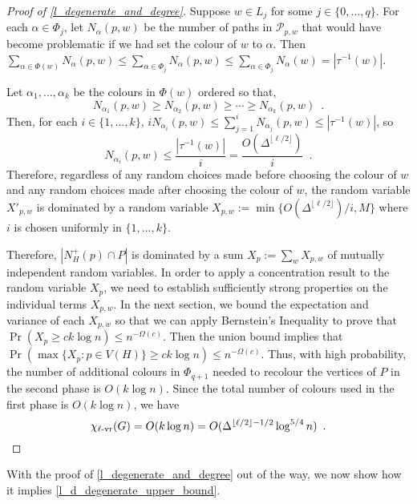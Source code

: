 \documentclass{patmorin}
\newcommand{\rn}[1]{\chi_{\operatorname{#1-vr}}}
\newcommand{\lrn}{\rn{\ell}}
\begin{document}
\begin{proof}[Proof of \cref{l_degenerate_and_degree}]
  Suppose $w\in L_j$ for some $j\in\{0,\ldots,q\}$.  For each $\alpha\in\Phi_j$, let $N_\alpha(p,w)$ be the number of paths in $\mathcal{P}_{p,w}$ that would have become problematic if we had set the colour of $w$ to $\alpha$. Then $\sum_{\alpha\in\Phi(w)} N_\alpha(p,w) \le \sum_{\alpha\in\Phi_j} N_\alpha(p,w) \le \sum_{\alpha\in\Phi_j} N_\alpha(w) = |\tau^{-1}(w)|$.

  Let $\alpha_1,\ldots,\alpha_k$ be the colours in $\Phi(w)$ ordered so that,
  \[
    N_{\alpha_1}(p,w) \ge N_{\alpha_2}(p,w) \ge\cdots\ge N_{\alpha_k}(p,w) \enspace .
  \]
  Then, for each $i\in\{1,\ldots,k\}$, $iN_{\alpha_i}(p,w)\le\sum_{j=1}^i N_{\alpha_j}(p,w) \le |\tau^{-1}(w)|$, so
  \[
    N_{\alpha_i}(p,w)\le \frac{|\tau^{-1}(w)|}{i}=\frac{O(\Delta^{\lfloor\ell/2\rfloor})}{i} \enspace .
  \]
  Therefore, regardless of any random choices made before choosing the colour of $w$ and any random choices made after choosing the colour of $w$, the random variable $X'_{p,w}$ is dominated by a random variable $X_{p,w}:=\min\{O(\Delta^{\lfloor\ell/2\rfloor})/i,M\}$ where $i$ is chosen uniformly in $\{1,\ldots,k\}$.

  Therefore, $|N_H^+(p)\cap P|$ is dominated by a sum $X_p:=\sum_{w} X_{p,w}$ of mutually independent random variables.  In order to apply a concentration result to the random variable $X_p$, we need to  establish sufficiently strong properties on the individual terms $X_{p,w}$.  In the next section, we bound the expectation and variance of each $X_{p,w}$ so that we can apply Bernstein's Inequality to prove that $\Pr(X_p\ge ck\log n)\le n^{-\Omega(c)}$.  Then the union bound implies that $\Pr(\max\{X_p:p\in V(H)\} \ge ck\log n)\le n^{-\Omega(c)}$.  Thus, with high probability, the number of additional colours in $\Phi_{q+1}$ needed to recolour the vertices of $P$ in the second phase is $O(k\log n)$.  Since the total number of colours used in the first phase is $O(k\log n)$, we have
  \[
    \lrn(G) = O(k \log n) = O(\Delta^{\lfloor\ell/2\rfloor-1/2}\log^{5/4} n) \enspace . \qedhere
  \]
\end{proof}

With the proof of \cref{l_degenerate_and_degree} out of the way, we now show how it implies \cref{l_d_degenerate_upper_bound}.
\end{document}
